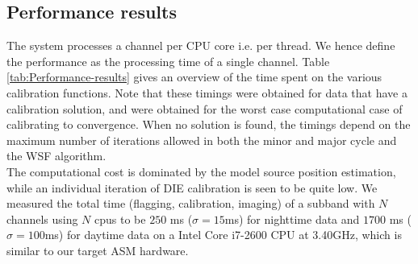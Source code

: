 \documentclass{aa}
\begin{document}
\subsection{Performance results}


The system processes a channel per CPU core i.e. per thread. We hence define the
performance   as   the   processing   time   of   a   single   channel.    Table
\ref{tab:Performance-results} gives an overview of the time spent on the various
calibration functions. Note that these  timings were obtained for data that have
a calibration solution, and were  obtained for the worst case computational case
of calibrating to convergence. When no  solution is found, the timings depend on
the maximum number  of iterations allowed in both the minor  and major cycle and
the WSF  algorithm. \\ The computational  cost is dominated by  the model source
position estimation, while an individual iteration of DIE calibration is seen to
be quite low.  We measured the  total time (flagging, calibration, imaging) of a
subband with $N$  channels using $N$ cpus  to be $250$ ms ($\sigma  = 15$ms) for
nighttime data and  $1700$ ms ($\sigma = 100$ms) for daytime  data on a Intel
Core i7-2600 CPU at 3.40GHz, which is similar to our target ASM hardware.
\begin{table}[tbh]
\caption{Functional profile of real-time calibration and imaging code}
\label{tab:Performance-results}

\end{table}
\end{document}

